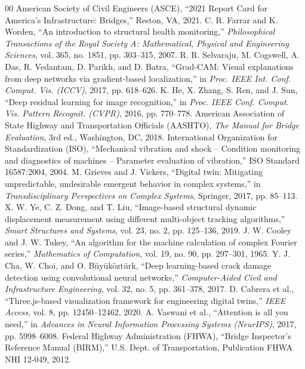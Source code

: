 \documentclass[10pt, conference, letterpaper]{IEEEtran}
\begin{document}
\begin{thebibliography}{00}
 American Society of Civil Engineers (ASCE), ``2021 Report Card for America's Infrastructure: Bridges,'' Reston, VA, 2021.
 C. R. Farrar and K. Worden, ``An introduction to structural health monitoring,'' \textit{Philosophical Transactions of the Royal Society A: Mathematical, Physical and Engineering Sciences}, vol. 365, no. 1851, pp. 303--315, 2007.
 R. R. Selvaraju, M. Cogswell, A. Das, R. Vedantam, D. Parikh, and D. Batra, ``Grad-CAM: Visual explanations from deep networks via gradient-based localization,'' in \textit{Proc. IEEE Int. Conf. Comput. Vis. (ICCV)}, 2017, pp. 618--626.
 K. He, X. Zhang, S. Ren, and J. Sun, ``Deep residual learning for image recognition,'' in \textit{Proc. IEEE Conf. Comput. Vis. Pattern Recognit. (CVPR)}, 2016, pp. 770--778.
 American Association of State Highway and Transportation Officials (AASHTO), \textit{The Manual for Bridge Evaluation}, 3rd ed., Washington, DC, 2018.
 International Organization for Standardization (ISO), ``Mechanical vibration and shock -- Condition monitoring and diagnostics of machines -- Parameter evaluation of vibration,'' ISO Standard 16587:2004, 2004.
 M. Grieves and J. Vickers, ``Digital twin: Mitigating unpredictable, undesirable emergent behavior in complex systems,'' in \textit{Transdisciplinary Perspectives on Complex Systems}, Springer, 2017, pp. 85--113.
 X. W. Ye, C. Z. Dong, and T. Liu, ``Image-based structural dynamic displacement measurement using different multi-object tracking algorithms,'' \textit{Smart Structures and Systems}, vol. 23, no. 2, pp. 125--136, 2019.
 J. W. Cooley and J. W. Tukey, ``An algorithm for the machine calculation of complex Fourier series,'' \textit{Mathematics of Computation}, vol. 19, no. 90, pp. 297--301, 1965.
 Y. J. Cha, W. Choi, and O. B{\"u}y{\"u}k{\"o}zt{\"u}rk, ``Deep learning-based crack damage detection using convolutional neural networks,'' \textit{Computer-Aided Civil and Infrastructure Engineering}, vol. 32, no. 5, pp. 361--378, 2017.
 D. Cabrera et al., ``Three.js-based visualization framework for engineering digital twins,'' \textit{IEEE Access}, vol. 8, pp. 12450--12462, 2020.
 A. Vaswani et al., ``Attention is all you need,'' in \textit{Advances in Neural Information Processing Systems (NeurIPS)}, 2017, pp. 5998--6008.
 Federal Highway Administration (FHWA), ``Bridge Inspector's Reference Manual (BIRM),'' U.S. Dept. of Transportation, Publication FHWA NHI 12-049, 2012.
\end{thebibliography}
\end{document}
